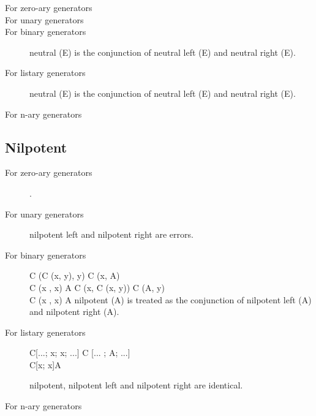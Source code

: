 \begin{description}
\item[For zero-ary generators] \na
\item[For unary generators] 
\item[For binary generators] 
neutral (E) is the conjunction of neutral left (E) and neutral right (E).
\item[For listary generators] 
neutral (E) is the conjunction of neutral left (E) and neutral right (E).

\item[For n-ary generators] \na

\end{description}


\subsection{Nilpotent}
\label{sec:nilpotent}
\begin{description}

\item[For zero-ary generators] \na.
\item[For unary generators] 
nilpotent left and nilpotent right are errors.
\item[For binary generators] 
{ C (C (x, y), y) \rw C (x, A) \\
  C (x , x) \rw A
}
{ C (x, C (x, y)) \rw C (A, y) \\
  C (x , x) \rw A
}
nilpotent (A) is treated as the conjunction of nilpotent left (A) and
nilpotent right (A).

\item[For listary generators] 
{C[...; x; x; ...] \rw C [... ; A; ...] \\
 C[x; x]\rw A
}

nilpotent, nilpotent left and nilpotent right are identical.
\item[For n-ary generators] \na

\end{description}


